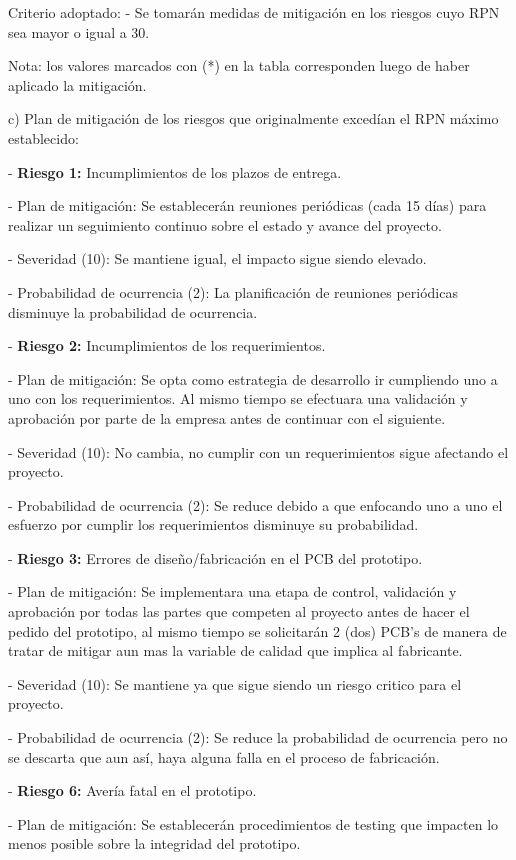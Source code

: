 \documentclass[11pt]{charter}
\begin{document}
Criterio adoptado:
	- Se tomarán medidas de mitigación en los riesgos cuyo RPN sea mayor o igual a 30.

Nota: los valores marcados con (*) en la tabla corresponden luego de haber aplicado la mitigación.

c) Plan de mitigación de los riesgos que originalmente excedían el RPN máximo establecido:
 
- \textbf{Riesgo 1:} Incumplimientos de los plazos de entrega.
	
	- Plan de mitigación: Se establecerán reuniones periódicas (cada 15 días) para realizar un seguimiento continuo sobre el estado y avance del proyecto. 
	
	- Severidad (10): Se mantiene igual, el impacto sigue siendo elevado.
	
	- Probabilidad de ocurrencia (2): La planificación de reuniones periódicas disminuye la probabilidad de ocurrencia. 

- \textbf{Riesgo 2:} Incumplimientos de los requerimientos.
	
	- Plan de mitigación: Se opta como estrategia de desarrollo ir cumpliendo uno a uno con los requerimientos. Al mismo tiempo se efectuara una validación y aprobación por parte de la empresa antes de continuar con el siguiente.
	
	- Severidad (10): No cambia, no cumplir con un requerimientos sigue afectando el proyecto. 
	
	- Probabilidad de ocurrencia (2): Se reduce debido a que enfocando uno a uno el esfuerzo por cumplir los requerimientos disminuye su probabilidad.

- \textbf{Riesgo 3:} Errores de diseño/fabricación en el PCB del prototipo.
	
	- Plan de mitigación: Se implementara una etapa de control, validación y aprobación por todas las partes que competen al proyecto antes de hacer el pedido del prototipo, al mismo tiempo se solicitarán 2 (dos) PCB's de manera de tratar de mitigar aun mas la variable de calidad que implica al fabricante. 
	
	- Severidad (10): Se mantiene ya que sigue siendo un riesgo critico para el proyecto. 
	
	- Probabilidad de ocurrencia (2): Se reduce la probabilidad de ocurrencia pero no se descarta que aun así, haya alguna falla en el proceso de fabricación.  

- \textbf{Riesgo 6:} Avería fatal en el prototipo.
	
	- Plan de mitigación: Se establecerán procedimientos de testing que impacten lo menos posible sobre la integridad del prototipo.
	
\end{document}
